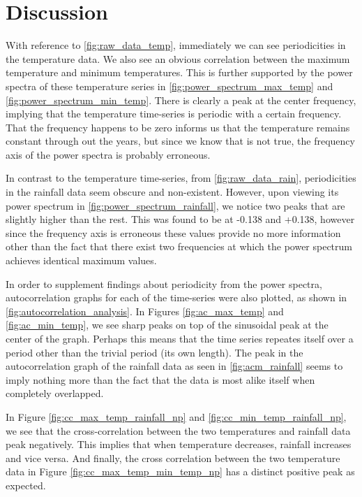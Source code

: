 \documentclass{article}
\begin{document}
\newpage
\section{Discussion}
With reference to \ref{fig:raw_data_temp}, immediately we can see periodicities in the temperature data. We also see an obvious correlation between the maximum temperature and minimum temperatures. This is further supported by the power spectra of these temperature series in \ref{fig:power_spectrum_max_temp} and \ref{fig:power_spectrum_min_temp}. There is clearly a peak at the center frequency, implying that the temperature time-series is periodic with a certain frequency. That the frequency happens to be zero informs us that the temperature remains constant through out the years, but since we know that is not true, the frequency axis of the power spectra is probably erroneous. 


In contrast to the temperature time-series, from \ref{fig:raw_data_rain}, periodicities in the rainfall data seem obscure and non-existent. However, upon viewing its power spectrum in \ref{fig:power_spectrum_rainfall}, we notice two peaks that are slightly higher than the rest. This was found to be at -0.138 and +0.138, however since the frequency axis is erroneous these values provide no more information other than the fact that there exist two frequencies at which the power spectrum achieves identical maximum values. 

In order to supplement findings about periodicity from the power spectra, autocorrelation graphs for each of the time-series were also plotted, as shown in \ref{fig:autocorrelation_analysis}. In Figures \ref{fig:ac_max_temp} and \ref{fig:ac_min_temp}, we see sharp peaks on top of the sinusoidal peak at the center of the graph. Perhaps this means that the time series repeates itself over a period other than the trivial period (its own length). The peak in the autocorrelation graph of the rainfall data as seen in \ref{fig:acm_rainfall} seems to imply nothing more than the fact that the data is most alike itself when completely overlapped. 

In Figure \ref{fig:cc_max_temp_rainfall_np} and \ref{fig:cc_min_temp_rainfall_np}, we see that the cross-correlation between the two temperatures and rainfall data peak negatively. This implies that when temperature decreases, rainfall increases and vice versa. And finally, the cross correlation between the two temperature data in Figure \ref{fig:cc_max_temp_min_temp_np} has a distinct positive peak as expected. 
\end{document}
